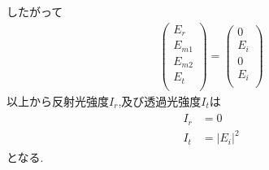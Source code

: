 \documentclass[uplatex,a4j,11pt,dvipdfmx]{jsarticle}
\begin{document}
したがって
\begin{align}
  \begin{pmatrix}
    E_r\\E_{m1}\\E_{m2}\\E_t\\
  \end{pmatrix}=
  \begin{pmatrix}
    0\\E_i\\0\\E_i\\
  \end{pmatrix}
\end{align}
以上から反射光強度$I_r$,及び透過光強度$I_t$は
\begin{align}
  \begin{split}
    I_r&=0\\
    I_t&=|E_i|^2
  \end{split}
\end{align}
となる.
\end{document}

